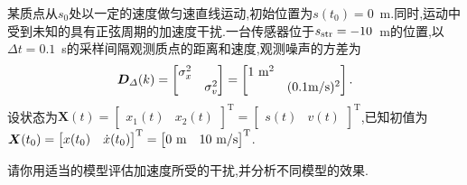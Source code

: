 \documentclass[cn,10pt,citestyle=gb7714-2015,bibstyle=gb7714-2015]{elegantbook}
\newcommand{\mT}{\mathrm{T}}
\begin{document}
\begin{example}
  某质点从$s_0$处以一定的速度做匀速直线运动,初始位置为$s(t_0)=0$\ m.同时,运动中
  受到未知的具有正弦周期的加速度干扰.一台传感器位于$s_{\textup{str}}=-10$\ m的位置,以
  $\Delta t=0.1$\ s的采样间隔观测质点的距离和速度,观测噪声的方差为
  \[
    \bm{D}_\varDelta(k)=\begin{bmatrix}
      \sigma_x^2& \\
       &\sigma_v^2
    \end{bmatrix}=\begin{bmatrix}
      1\ \textup{m}^2& \\
       &(0.1\textup{m/s})^2
    \end{bmatrix}.
  \]
  设状态为$\bm{X}(t)=\begin{bmatrix}
    x_1(t)&x_2(t)
  \end{bmatrix}^\mT=\begin{bmatrix}
    s(t)&v(t)
  \end{bmatrix}^\mT$,已知初值为$\bm{X}(t_0)=\begin{bmatrix}
    x(t_0)&\dot{x}(t_0)
  \end{bmatrix}^\mT=\begin{bmatrix}
    0\ \textup{m}&10\ \textup{m/s}
  \end{bmatrix}^\mT$.

  请你用适当的模型评估加速度所受的干扰,并分析不同模型的效果.
\end{example}
\end{document}
